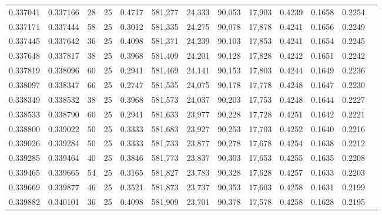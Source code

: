 \begin{tabular}{rrrrrrrrrrrrr}
0.337041 & 0.337166 &    28 &  25 &                                     0.4717 & 581,277 &  24,333 &  90,053 &  17,903 & 0.4239 & 0.1658 & 0.2254 \\
0.337171 & 0.337444 &    58 &  25 &                                     0.3012 & 581,335 &  24,275 &  90,078 &  17,878 & 0.4241 & 0.1656 & 0.2249 \\
0.337445 & 0.337642 &    36 &  25 &                                     0.4098 & 581,371 &  24,239 &  90,103 &  17,853 & 0.4241 & 0.1654 & 0.2245 \\
0.337648 & 0.337817 &    38 &  25 &                                     0.3968 & 581,409 &  24,201 &  90,128 &  17,828 & 0.4242 & 0.1651 & 0.2242 \\
0.337819 & 0.338096 &    60 &  25 &                                     0.2941 & 581,469 &  24,141 &  90,153 &  17,803 & 0.4244 & 0.1649 & 0.2236 \\
0.338097 & 0.338347 &    66 &  25 &                                     0.2747 & 581,535 &  24,075 &  90,178 &  17,778 & 0.4248 & 0.1647 & 0.2230 \\
0.338349 & 0.338532 &    38 &  25 &                                     0.3968 & 581,573 &  24,037 &  90,203 &  17,753 & 0.4248 & 0.1644 & 0.2227 \\
0.338533 & 0.338790 &    60 &  25 &                                     0.2941 & 581,633 &  23,977 &  90,228 &  17,728 & 0.4251 & 0.1642 & 0.2221 \\
0.338800 & 0.339022 &    50 &  25 &                                     0.3333 & 581,683 &  23,927 &  90,253 &  17,703 & 0.4252 & 0.1640 & 0.2216 \\
0.339026 & 0.339284 &    50 &  25 &                                     0.3333 & 581,733 &  23,877 &  90,278 &  17,678 & 0.4254 & 0.1638 & 0.2212 \\
0.339285 & 0.339464 &    40 &  25 &                                     0.3846 & 581,773 &  23,837 &  90,303 &  17,653 & 0.4255 & 0.1635 & 0.2208 \\
0.339465 & 0.339665 &    54 &  25 &                                     0.3165 & 581,827 &  23,783 &  90,328 &  17,628 & 0.4257 & 0.1633 & 0.2203 \\
0.339669 & 0.339877 &    46 &  25 &                                     0.3521 & 581,873 &  23,737 &  90,353 &  17,603 & 0.4258 & 0.1631 & 0.2199 \\
0.339882 & 0.340101 &    36 &  25 &                                     0.4098 & 581,909 &  23,701 &  90,378 &  17,578 & 0.4258 & 0.1628 & 0.2195 \\

\end{tabular}
